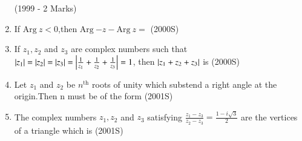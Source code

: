 \documentclass[journal]{IEEEtran}
\begin{document}
\begin{enumerate}[start=6]
\hfill{(1999 - 2 Marks)}
\begin{enumerate}
\end{enumerate}
\item If $\mathrm{Arg}\ z<0$,then $\mathrm{Arg}\ {-z}-\mathrm{Arg}\ z= $
\hfill{(2000S)}
\begin{enumerate}
\end{enumerate}
\item If $z_1,z_2$ and $z_3$ are complex numbers such that $\left\vert z_1\right\vert=\left\vert z_2\right\vert=\left\vert z_3\right\vert=\left\vert\frac{1}{z_1}+\frac{1}{z_2}+\frac{1}{z_3}\right\vert=1$, then $\left\vert z_1+z_2+z_3\right\vert$ is 
\hfill{(2000S)}
\begin{enumerate}
\end{enumerate}
\item Let $z_1$ and $z_2$ be $n^{\text{th}}$ roots of unity which substend a right angle at the origin.Then n must be of the form
\hfill{(2001S)}
\begin{enumerate}
\end{enumerate}
\item The complex numbers $z_1,z_2$ and $z_3$ satisfying $\frac{z_1-z_3}{z_2-z_3}=\frac{1-i\sqrt{3}}{2}$ are the vertices of a triangle which is
\hfill{(2001S)}

\end{enumerate}
\end{document}
